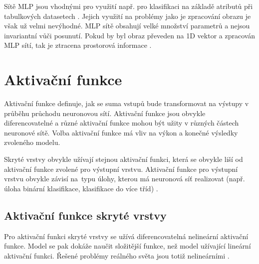 Sítě MLP jsou vhodnými pro využití např. pro klasifikaci na základě atributů při tabulkových datasetech \cite{WhenToUseMLPCNN}. Jejich využití na problémy jako je zpracování obrazu je však už velmi nevýhodné. MLP sítě obsahují velké množství parametrů a nejsou invariantní vůči posunutí. Pokud by byl obraz převeden na 1D vektor a zpracován MLP sítí, tak je ztracena prostorová informace \cite{CNNvsMLP}.





\section{Aktivační funkce}
Aktivační funkce definuje, jak se suma vstupů bude transformovat na výstupy v průběhu průchodu neuronovou sítí. Aktivační funkce jsou obvykle diferencovatelné a různé aktivační funkce mohou být užity v různých částech neuronové sítě. Volba aktivační funkce má vliv na výkon a konečné výsledky zvoleného modelu. 

Skryté vrstvy obvykle užívají stejnou aktivační funkci, která se obvykle liší od aktivační funkce zvolené pro výstupní vrstvu. Aktivační funkce pro výstupní vrstvu obvykle závisí na~typu úlohy, kterou má neuronová síť realizovat (např. úloha binární klasifikace, klasifikace do více tříd) \cite{HowToChooseActivationFunction}.

\subsection{Aktivační funkce skryté vrstvy}
Pro aktivační funkci skryté vrstvy se užívá diferencovatelná nelineární aktivační funkce. Model se pak dokáže naučit složitější funkce, než model užívající lineární aktivační funkci. Řešené problémy reálného světa jsou totiž nelineárními \cite{HowToChooseActivationFunction}. 

